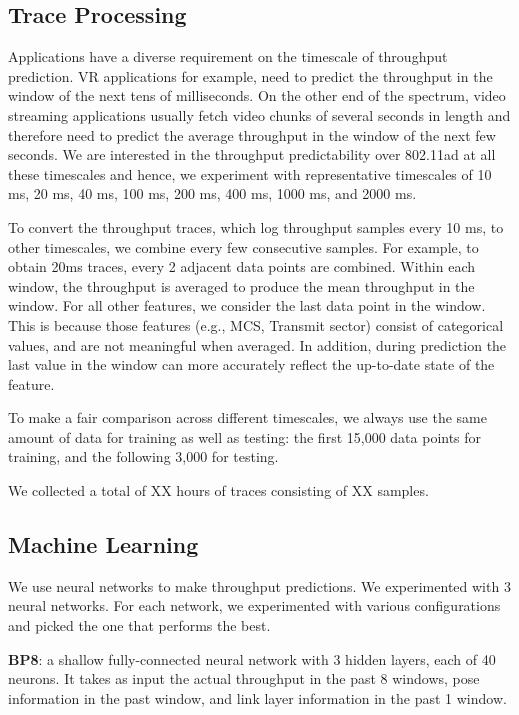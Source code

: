 \documentclass[sigconf,anonymous]{acmart}
\begin{document}
\subsection{Trace Processing}

Applications have a diverse requirement on the timescale of throughput prediction. VR applications for example, need to predict the throughput in the window of the next tens of milliseconds. On the other end of the spectrum, video streaming applications usually fetch video chunks of several seconds in length and therefore need to predict the average throughput in the window of the next few seconds. We are interested in the throughput predictability over 802.11ad at all these timescales and hence, we experiment with representative timescales of 10 ms, 20 ms, 40 ms, 100 ms, 200 ms, 400 ms, 1000 ms, and 2000 ms.

To convert the throughput traces, which log throughput samples every 10 ms, to other timescales, we combine every few consecutive samples. For example, to obtain 20ms traces, every 2 adjacent data points are combined. Within each window, the throughput is averaged to produce the mean throughput in the window. For all other features, we consider the last data point in the window. This is because those features (e.g., MCS, Transmit sector) consist of categorical values, and are not meaningful when averaged. In addition, during prediction the last value in the window can more accurately reflect the up-to-date state of the feature.

To make a fair comparison across different timescales, we always use the same amount of data for training as well as testing: the first 15,000 data points for training, and the following 3,000 for testing.

We collected a total of XX hours of traces consisting of XX samples.

\subsection{Machine Learning}
\label{subsection: Machine Learning}

We use neural networks to make throughput predictions. We experimented with 3 neural networks. For each network, we experimented with various configurations and picked the one that performs the best.

\textbf{BP8}: a shallow fully-connected neural network with 3 hidden layers, each of 40 neurons. It takes as input the actual throughput in the past 8 windows, pose information in the past window, and link layer information in the past 1 window.
\end{document}
